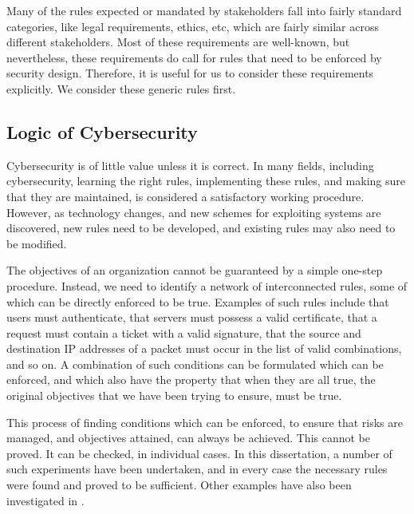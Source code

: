 Many of the rules expected or mandated by stakeholders fall into fairly standard categories, like legal requirements, ethics, etc, which are fairly similar across different stakeholders. Most of these 
 requirements are well-known, but nevertheless, these requirements do call for rules that need to be enforced by security design. Therefore, it is useful for us to consider these requirements explicitly. We consider these generic rules first.

\subsection{Logic of Cybersecurity}
 
Cybersecurity is of little value unless it is correct. In many fields,
including cybersecurity, learning the right rules, implementing
these rules, and making sure that they are maintained, is considered
a satisfactory working procedure. However, as technology changes, and
new schemes for exploiting systems are discovered, new rules need to be
developed, and existing rules may also need to be modified.

The objectives of an organization cannot be guaranteed by a simple
one-step procedure. Instead, we need to identify a network of
interconnected rules, some of which can be directly enforced to be
true. Examples of such rules include that users must authenticate, that
servers must possess a valid certificate, that a request must contain
a ticket with a valid signature, that the source and destination IP
addresses of a packet must occur in the list of valid combinations, and
so on. A combination of such conditions can be formulated which can be
enforced, and which also have the property that when they are all true,
the original objectives that we have been trying to ensure, must be true.

This process of finding conditions which can be enforced, to ensure
that risks are managed, and objectives attained, can always be
achieved. This cannot be proved. It can be checked, in individual
cases. In this dissertation,  a number of such experiments have been
undertaken, and in every case the necessary rules were found and
proved to be sufficient. Other examples have also been investigated in
 \cite{Hadaad15,sheniar2018experiments,sheniar2019Graph}.




 
